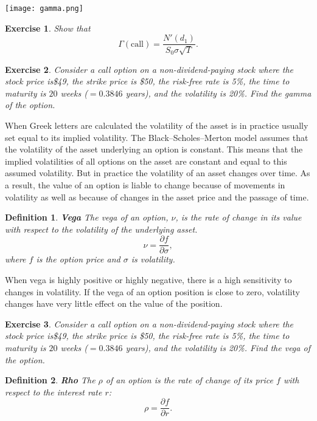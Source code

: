 \documentclass[letterpaper,10pt]{article}
\newtheorem{df}{Definition}[section]
\newtheorem{ex}{Exercise}
\begin{document}
\texttt{[image: gamma.png]}

\begin{ex}
Show that $$\Gamma(\text{call})=\frac{N'(d_1)}{S_0\sigma\sqrt{T}}.$$
\end{ex}


\begin{ex}
Consider a call option on a non-dividend-paying stock where
the stock price is\$49, the strike price is \$50, the risk-free rate is 5\%, the time to
maturity is $20$ weeks ($= 0.3846$ years), and the volatility is 20\%.  Find the gamma of the option.
\end{ex}

\noindent When Greek letters are calculated the volatility of the
asset is in practice usually set equal to its implied volatility. The Black–Scholes–Merton
model assumes that the volatility of the asset underlying an option is constant. This
means that the implied volatilities of all options on the asset are constant and equal to
this assumed volatility.
But in practice the volatility of an asset changes over time. As a result, the value of an
option is liable to change because of movements in volatility as well as because of
changes in the asset price and the passage of time. 

\begin{df}{\bf Vega}
The vega of an option, $\nu$, is the rate
of change in its value with respect to the volatility of the underlying asset.  $$\nu=\frac{\partial f}{\partial \sigma},$$ where $f$ is the option price and $\sigma$ is volatility.
\end{df}

\noindent When vega is highly positive or highly negative, there is a high sensitivity to
changes in volatility. If the vega of an option position is close to zero, volatility changes
have very little effect on the value of the position.

\begin{ex}
Consider a call option on a non-dividend-paying stock where
the stock price is\$49, the strike price is \$50, the risk-free rate is 5\%, the time to
maturity is $20$ weeks ($= 0.3846$ years), and the volatility is 20\%.  Find the vega of the option.
\end{ex}


\begin{df}{\bf Rho}
The $\rho$ of an option is the rate of change of its price $f$ with respect to the interest rate $r$:  $$\rho=\frac{\partial f}{\partial r}.$$
\end{df}
\end{document}

